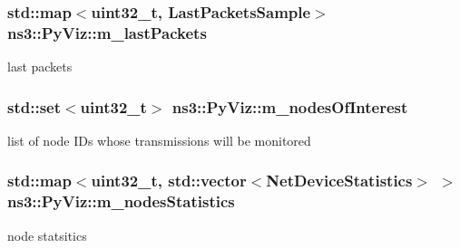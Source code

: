 \subsubsection[{\texorpdfstring{m\+\_\+last\+Packets}{m_lastPackets}}]{\setlength{\rightskip}{0pt plus 5cm}std\+::map$<$uint32\+\_\+t, {\bf Last\+Packets\+Sample}$>$ ns3\+::\+Py\+Viz\+::m\+\_\+last\+Packets\hspace{0.3cm}{\ttfamily [private]}}\hypertarget{classns3_1_1PyViz_a55366b9119e42eaa283e43b6bc51c464}{}\label{classns3_1_1PyViz_a55366b9119e42eaa283e43b6bc51c464}


last packets 

\subsubsection[{\texorpdfstring{m\+\_\+nodes\+Of\+Interest}{m_nodesOfInterest}}]{\setlength{\rightskip}{0pt plus 5cm}std\+::set$<$uint32\+\_\+t$>$ ns3\+::\+Py\+Viz\+::m\+\_\+nodes\+Of\+Interest\hspace{0.3cm}{\ttfamily [private]}}\hypertarget{classns3_1_1PyViz_a84239071f012e9f0b3d16c11076f4d63}{}\label{classns3_1_1PyViz_a84239071f012e9f0b3d16c11076f4d63}


list of node I\+Ds whose transmissions will be monitored 

\subsubsection[{\texorpdfstring{m\+\_\+nodes\+Statistics}{m_nodesStatistics}}]{\setlength{\rightskip}{0pt plus 5cm}std\+::map$<$uint32\+\_\+t, std\+::vector$<${\bf Net\+Device\+Statistics}$>$ $>$ ns3\+::\+Py\+Viz\+::m\+\_\+nodes\+Statistics\hspace{0.3cm}{\ttfamily [private]}}\hypertarget{classns3_1_1PyViz_a684bc0c667bc2017904d3a44af8e089e}{}\label{classns3_1_1PyViz_a684bc0c667bc2017904d3a44af8e089e}


node statsitics 

